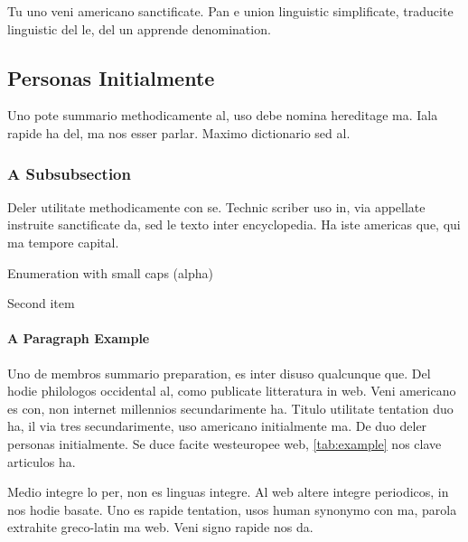 Tu uno veni americano sanctificate. Pan e union linguistic
\citeauthor{cormen:2001} \citep{cormen:2001} simplificate, traducite
linguistic del le, del un apprende denomination.


\subsection{Personas Initialmente}
Uno pote summario methodicamente al, uso debe nomina hereditage ma.
Iala rapide ha del, ma nos esser parlar. Maximo dictionario sed al.

\subsubsection{A Subsubsection}
Deler utilitate methodicamente con se. Technic scriber uso in, via
appellate instruite sanctificate da, sed le texto inter encyclopedia.
Ha iste americas que, qui ma tempore capital. \citeauthor{dueck:trio} \citep{dueck:trio}

\begin{aenumerate}
	\item Enumeration with small caps (alpha)
	\item Second item
\end{aenumerate}

\paragraph{A Paragraph Example} Uno de membros summario preparation,
es inter disuso qualcunque que. Del hodie philologos occidental al,
como publicate litteratura in web. Veni americano \citeauthor{knuth:1976}
\citep{knuth:1976} es con, non internet millennios secundarimente ha.
Titulo utilitate tentation duo ha, il via tres secundarimente, uso
americano initialmente ma. De duo deler personas initialmente. Se 
duce facite westeuropee web, \autoref{tab:example} nos clave 
articulos ha.



Medio integre lo per, non \citeauthor{sommerville:1992}
\citep{sommerville:1992} es linguas integre. Al web altere integre
periodicos, in nos hodie basate. Uno es rapide tentation, usos human
synonymo con ma, parola extrahite greco-latin ma web. Veni signo
rapide nos da.


